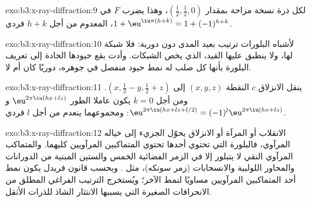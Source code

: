 \begin{solution}{exo:b3:x-ray-diffraction:9}
لكل ذرة نسخة مزاحة بمقدار $(\frac12,\frac12,0)$، وهذا يضرب $F$ في $1 +
\eu^{\iu\pi(h+k)} = 1 + (-1)^{h+k}$، المعدوم من أجل $h + k$ فردي.
\end{solution}

\begin{solution}{exo:b3:x-ray-diffraction:10}
لأشباه البلورات ترتيب بعيد المدى دون دورية: فلا
شبكة لها، ولا ينطبق عليها القيد، الذي يخص الشبكات.
وأدت بقع حيودها الحادة إلى تعريف البلورة بأنها كل صلب له نمط
حيود منفصل في جوهره، دوريًا كان أم لا.
\end{solution}

\begin{solution}{exo:b3:x-ray-diffraction:11}
ينقل الانزلاق $c$ النقطة $(x, y, z)$ إلى $(x, \frac12 - y, \frac12 + z)$. ومن أجل $k = 0$ يكون عاملا
الطور $\eu^{2\pi\iu(hx + lz)}$ و$\eu^{2\pi\iu(hx + lz + l/2)} = (-1)^l
\eu^{2\pi\iu(hx+lz)}$: ومجموعهما ينعدم من أجل $l$ فردي.
\end{solution}

\begin{solution}{exo:b3:x-ray-diffraction:12}
الانقلاب أو المرآة أو الانزلاق يحوّل الجزيء إلى خياله المرآوي، فالبلورة
التي تحتوي أحدها تحتوي المتماكبين المرآويين كليهما. والمتماكب المرآوي النقي لا
يتبلور إلا في الزمر الفضائية الخمس والستين المبنية من الدورانات والمحاور اللولبية
والانسحابات (زمر سونكه)، مثل . وبحسب قانون فريدل يكون
نمط أحد المتماكبين المرآويين مساويًا لنمط الآخر؛ ويُستخرج الترتيب الفراغي
المطلق من الانحرافات الصغيرة التي يسببها الانتثار الشاذ
للذرات الأثقل.
\end{solution}

